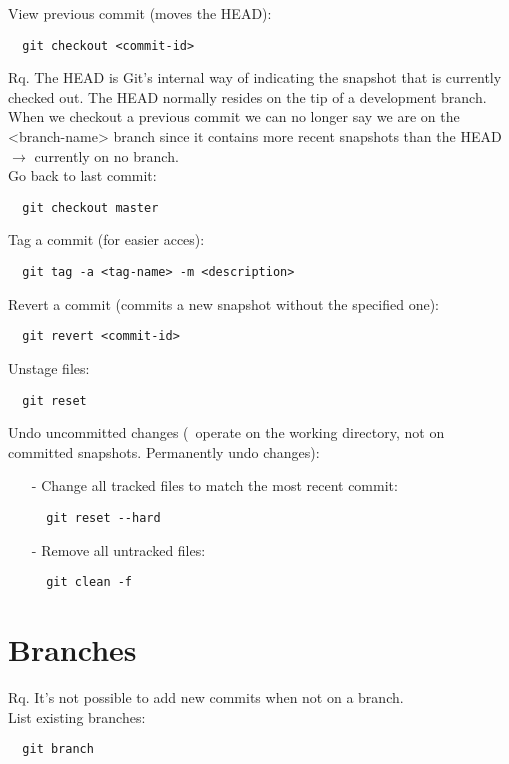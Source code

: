 \documentclass[french]{article}
\begin{document}
View previous commit (moves the HEAD):
\begin{verbatim}
  git checkout <commit-id>
\end{verbatim}
Rq. The HEAD is Git's internal way of indicating the snapshot that is currently checked out. The HEAD normally resides on the tip of a development branch. When we checkout a previous commit we can no longer say we are on the <branch-name> branch since it contains more recent snapshots than the HEAD $\rightarrow$ currently on no branch.\\

Go back to last commit:
\begin{verbatim}
  git checkout master
\end{verbatim}

Tag a commit (for easier acces):
\begin{verbatim}
  git tag -a <tag-name> -m <description>
\end{verbatim}

Revert a commit (commits a new snapshot without the specified one):
\begin{verbatim}
  git revert <commit-id>
\end{verbatim}

Unstage files:
\begin{verbatim}
  git reset
\end{verbatim}

Undo uncommitted changes (\danger\ operate on the working directory, not on committed snapshots. Permanently undo changes):
\begin{itemize}
\item [-] Change all tracked files to match the most recent commit:
\begin{verbatim}
  git reset --hard
\end{verbatim}
\item [-] Remove all untracked files:
\begin{verbatim}
  git clean -f
\end{verbatim}
\end{itemize}

\section{Branches}

Rq. It's not possible to add new commits when not on a branch.\\

List existing branches:
\begin{verbatim}
  git branch
\end{verbatim}
\end{document}
